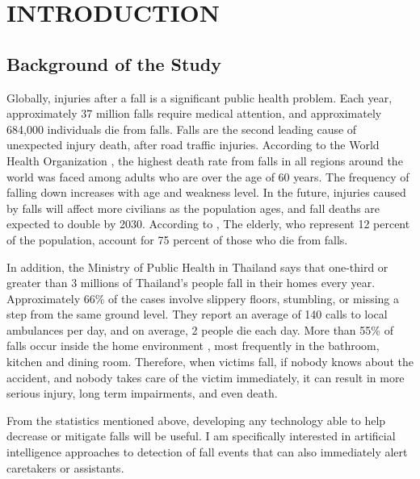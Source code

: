 \setlength{\parindent}{0in}
\setlength{\parskip}{1em}
\setlength{\baselineskip}{1.6em}

\chapter{INTRODUCTION}

\section{Background of the Study}
Globally, injuries after a fall is a significant public health problem. Each year, approximately 37 million falls require medical attention, and approximately 684,000 individuals die from falls. Falls are the second leading cause of unexpected injury death, after road traffic injuries. According to the World Health Organization \cite{world_health_organization_2018}, the highest death rate from falls in all regions around the world was faced among adults who are over the age of 60 years. The frequency of falling down increases with age and weakness level. In the future, injuries caused by falls will affect more civilians as the population ages, and fall deaths are expected to double by 2030. According to \citeauthor{fuller_2013} \citeyear{fuller_2013}, The elderly, who represent 12 percent of the population, account for 75 percent of those who die from falls.

In addition, the Ministry of Public Health in Thailand \cite{thaincd.com_2019} says that one-third or greater than 3 millions of Thailand’s people fall in their homes every year. Approximately 66\% of the cases involve slippery floors, stumbling, or missing a step from the same ground level. They report an average of 140 calls to local ambulances per day, and on average, 2 people die each day. More than 55\% of falls occur inside the home environment \cite{pynoos_steinman_nguyen_2010}, most frequently in the bathroom, kitchen and dining room. Therefore, when victims fall, if nobody knows about the accident, and nobody takes care of the victim immediately, it can result in more serious injury, long term impairments, and even death.

From the statistics mentioned above, developing any technology able to help decrease or mitigate falls will be useful. I am specifically interested in artificial intelligence approaches to detection of fall events that can also immediately alert caretakers or assistants.

